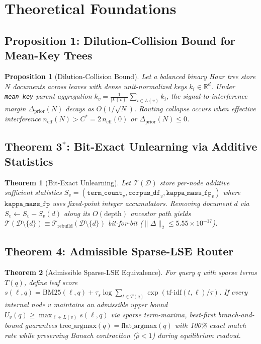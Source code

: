 \documentclass[conference]{IEEEtran}
\newtheorem{proposition}{Proposition}
\newtheorem{theorem}{Theorem}
\begin{document}
\section{Theoretical Foundations}

\subsection{Proposition 1: Dilution-Collision Bound for Mean-Key Trees}
\begin{proposition}[Dilution-Collision Bound]
Let a balanced binary Haar tree store $N$ documents across leaves with dense unit-normalized keys $k_i \in \mathbb{R}^d$. Under \texttt{mean\_key} parent aggregation $k_v = \frac{1}{|L(v)|} \sum_{i \in L(v)} k_i$, the signal-to-interference margin $\Delta_{\text{prior}}(N)$ decays as $O(1/\sqrt{N})$. Routing collapse occurs when effective interference $n_{\text{eff}}(N) > C^* = 2\,n_{\text{eff}}(0)$ or $\Delta_{\text{prior}}(N) \le 0$.
\end{proposition}

\subsection{Theorem 3$^*$: Bit-Exact Unlearning via Additive Statistics}
\begin{theorem}[Bit-Exact Unlearning]
Let $\mathcal{T}(\mathcal{D})$ store per-node additive sufficient statistics $S_v = (\texttt{term\_count}_v, \texttt{corpus\_df}_v, \texttt{kappa\_mass\_fp}_v)$ where $\texttt{kappa\_mass\_fp}$ uses fixed-point integer accumulators. Removing document $d$ via $S_v \leftarrow S_v - S_v(d)$ along its $O(\text{depth})$ ancestor path yields $\mathcal{T}(\mathcal{D} \setminus \{d\}) \equiv \mathcal{T}_{\text{rebuild}}(\mathcal{D} \setminus \{d\})$ bit-for-bit ($\|\Delta\|_2 \le 5.55 \times 10^{-17}$).
\end{theorem}

\subsection{Theorem 4: Admissible Sparse-LSE Router}
\begin{theorem}[Admissible Sparse-LSE Equivalence]
For query $q$ with sparse terms $T(q)$, define leaf score $s(\ell, q) = \text{BM25}(\ell, q) + \tau_s \log \sum_{t \in T(q)} \exp(\text{tf-idf}(t, \ell)/\tau)$. If every internal node $v$ maintains an admissible upper bound $U_v(q) \ge \max_{\ell \in L(v)} s(\ell, q)$ via sparse term-maxima, best-first branch-and-bound guarantees $\text{tree\_argmax}(q) = \text{flat\_argmax}(q)$ with 100\% exact match rate while preserving Banach contraction ($\hat{\rho} < 1$) during equilibrium readout.
\end{theorem}
\end{document}
